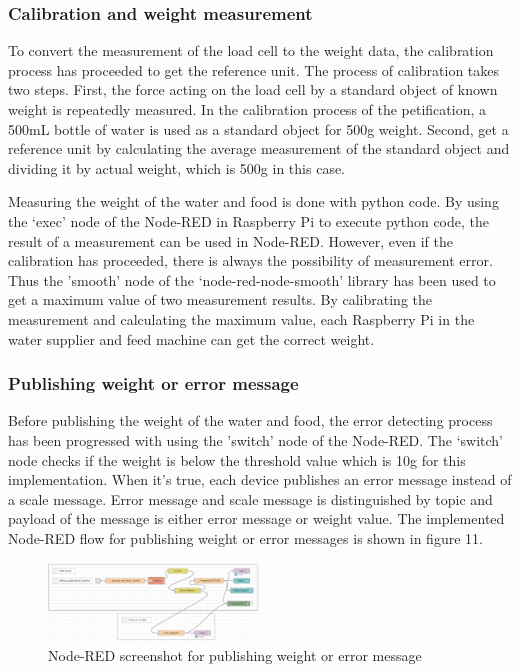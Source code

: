 \documentclass[conference]{IEEEtran}
\begin{document}
\subsubsection{Calibration and weight measurement}
To convert the measurement of the load cell to the weight data, the calibration process has proceeded to get the reference unit. The process of calibration takes two steps. First, the force acting on the load cell by a standard object of known weight is repeatedly measured. In the calibration process of the petification, a 500mL bottle of water is used as a standard object for 500g weight. Second, get a reference unit by calculating the average measurement of the standard object and dividing it by actual weight, which is 500g in this case.

Measuring the weight of the water and food is done with python code. By using the ‘exec’ node of the Node-RED in Raspberry Pi to execute python code, the result of a measurement can be used in Node-RED. However, even if the calibration has proceeded, there is always the possibility of measurement error. Thus the ’smooth’ node of the ‘node-red-node-smooth’ library has been used to get a maximum value of two measurement results. By calibrating the measurement and calculating the maximum value, each Raspberry Pi in the water supplier and feed machine can get the correct weight.

\subsubsection{Publishing weight or error message}
Before publishing the weight of the water and food, the error detecting process has been progressed with using the ’switch’ node of the Node-RED. The ‘switch’ node checks if the weight is below the threshold value which is 10g for this implementation. When it’s true, each device publishes an error message instead of a scale message. Error message and scale message is distinguished by topic and payload of the message is either error message or weight value. The implemented Node-RED flow for publishing weight or error messages is shown in figure 11.

\begin{figure}[htbp]
\centerline{\includegraphics[width=0.5\textwidth]{./images/Water Supplier Error Detection.png}}
\caption{Node-RED screenshot for publishing weight or error message}
\label{fig}
\end{figure}
\end{document}
